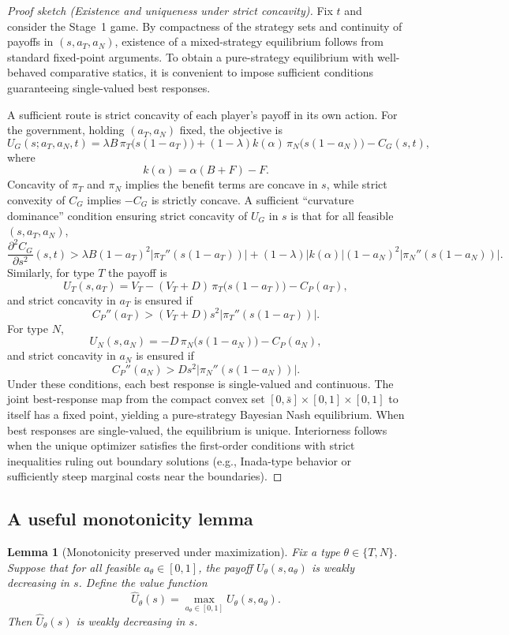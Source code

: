 \documentclass[11pt,a4paper]{article}
\newtheorem{lemma}{Lemma}
\theoremstyle{definition}
\theoremstyle{remark}
\theoremstyle{definition}
\begin{document}
\begin{proof}[Proof sketch (Existence and uniqueness under strict concavity)]
Fix $t$ and consider the Stage~1 game. By compactness of the strategy sets and continuity of payoffs in $(s,a_T,a_N)$, existence of a mixed-strategy equilibrium follows from standard fixed-point arguments. To obtain a pure-strategy equilibrium with well-behaved comparative statics, it is convenient to impose sufficient conditions guaranteeing single-valued best responses.

A sufficient route is strict concavity of each player's payoff in its own action. For the government, holding $(a_T,a_N)$ fixed, the objective is
$$
U_G(s;a_T,a_N,t)
=
\lambda B\,\pi_T\!\bigl(s(1-a_T)\bigr)
+
(1-\lambda)k(\alpha)\,\pi_N\!\bigl(s(1-a_N)\bigr)
-
C_G(s,t),
$$
where
$$
k(\alpha)=\alpha(B+F)-F.
$$
Concavity of $\pi_T$ and $\pi_N$ implies the benefit terms are concave in $s$, while strict convexity of $C_G$ implies $-C_G$ is strictly concave. A sufficient ``curvature dominance'' condition ensuring strict concavity of $U_G$ in $s$ is that for all feasible $(s,a_T,a_N)$,
$$
\frac{\partial^2 C_G}{\partial s^2}(s,t)
>
\lambda B(1-a_T)^2\bigl|\pi_T''(s(1-a_T))\bigr|
+
(1-\lambda)\bigl|k(\alpha)\bigr|(1-a_N)^2\bigl|\pi_N''(s(1-a_N))\bigr|.
$$
Similarly, for type $T$ the payoff is
$$
U_T(s,a_T)
=
V_T
-
(V_T+D)\,\pi_T\!\bigl(s(1-a_T)\bigr)
-
C_P(a_T),
$$
and strict concavity in $a_T$ is ensured if
$$
C_P''(a_T) > (V_T+D)s^2\bigl|\pi_T''(s(1-a_T))\bigr|.
$$
For type $N$,
$$
U_N(s,a_N)
=
-D\,\pi_N\!\bigl(s(1-a_N)\bigr)
-
C_P(a_N),
$$
and strict concavity in $a_N$ is ensured if
$$
C_P''(a_N) > Ds^2\bigl|\pi_N''(s(1-a_N))\bigr|.
$$
Under these conditions, each best response is single-valued and continuous. The joint best-response map from the compact convex set $[0,\bar s]\times[0,1]\times[0,1]$ to itself has a fixed point, yielding a pure-strategy Bayesian Nash equilibrium. When best responses are single-valued, the equilibrium is unique. Interiorness follows when the unique optimizer satisfies the first-order conditions with strict inequalities ruling out boundary solutions (e.g., Inada-type behavior or sufficiently steep marginal costs near the boundaries).
\end{proof}

\subsection{A useful monotonicity lemma}

\begin{lemma}[Monotonicity preserved under maximization]
Fix a type $\theta \in \{T,N\}$. Suppose that for all feasible $a_\theta \in [0,1]$, the payoff $U_\theta(s,a_\theta)$ is weakly decreasing in $s$.
Define the value function
$$
\widehat U_\theta(s)=\max_{a_\theta\in[0,1]} U_\theta(s,a_\theta).
$$
Then $\widehat U_\theta(s)$ is weakly decreasing in $s$.
\end{lemma}
\end{document}
